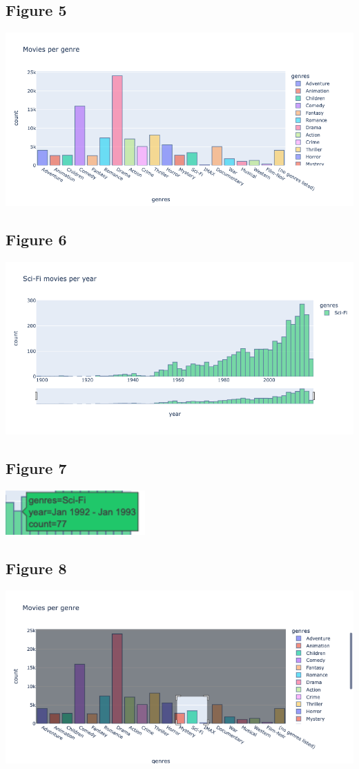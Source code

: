 \documentclass{article}
\begin{document}
\subsection{Figure 5}
\includegraphics[width=1\textwidth]{img/movies_genre.png}

\subsection{Figure 6}
\includegraphics[width=1\textwidth]{img/movies-scifi.png}

\subsection{Figure 7}
\includegraphics[width=0.4\textwidth]{img/tooltip.png}

\subsection{Figure 8}
\includegraphics[width=1\textwidth]{img/brushing.png}
\end{document}
